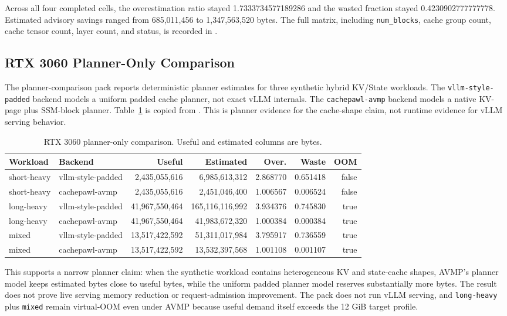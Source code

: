\documentclass[11pt]{article}
\begin{document}
Across all four completed cells, the overestimation ratio stayed
1.7333734577189286 and the wasted fraction stayed 0.4230902777777778.
Estimated advisory savings ranged from 685,011,456 to 1,347,563,520 bytes. The
full matrix, including \texttt{num\_blocks}, cache group count, cache tensor
count, layer count, and status, is recorded in
.

\subsection{RTX 3060 Planner-Only Comparison}

The planner-comparison pack reports deterministic planner estimates for three
synthetic hybrid KV/State workloads. The \texttt{vllm-style-padded} backend
models a uniform padded cache planner, not exact vLLM internals. The
\texttt{cachepawl-avmp} backend models a native KV-page plus SSM-block planner.
Table~\ref{tab:planner-comparison} is copied from
. This is
planner evidence for the cache-shape claim, not runtime evidence for vLLM
serving behavior.

\begin{table}[ht]
\centering
\small
\begin{tabular}{llrrrrr}
\hline
Workload & Backend & Useful & Estimated & Over. & Waste & OOM \\
\hline
short-heavy & vllm-style-padded & 2,435,055,616 & 6,985,613,312 & 2.868770 & 0.651418 & false \\
short-heavy & cachepawl-avmp & 2,435,055,616 & 2,451,046,400 & 1.006567 & 0.006524 & false \\
long-heavy & vllm-style-padded & 41,967,550,464 & 165,116,116,992 & 3.934376 & 0.745830 & true \\
long-heavy & cachepawl-avmp & 41,967,550,464 & 41,983,672,320 & 1.000384 & 0.000384 & true \\
mixed & vllm-style-padded & 13,517,422,592 & 51,311,017,984 & 3.795917 & 0.736559 & true \\
mixed & cachepawl-avmp & 13,517,422,592 & 13,532,397,568 & 1.001108 & 0.001107 & true \\
\hline
\end{tabular}
\caption{RTX 3060 planner-only comparison. Useful and estimated columns are bytes.}
\label{tab:planner-comparison}
\end{table}

This supports a narrow planner claim: when the synthetic workload contains
heterogeneous KV and state-cache shapes, AVMP's planner model keeps estimated
bytes close to useful bytes, while the uniform padded planner model reserves
substantially more bytes. The result does not prove live serving memory
reduction or request-admission improvement. The pack does not run vLLM serving,
and \texttt{long-heavy} plus \texttt{mixed} remain virtual-OOM even under AVMP
because useful demand itself exceeds the 12 GiB target profile.
\end{document}
